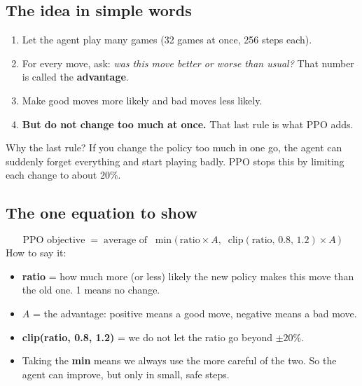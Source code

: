 \documentclass[11pt,a4paper]{article}
\begin{document}
\subsection*{The idea in simple words}
\begin{enumerate}
  \item Let the agent play many games (32 games at once, 256 steps each).
  \item For every move, ask: \emph{was this move better or worse than usual?} That number is
        called the \textbf{advantage}.
  \item Make good moves more likely and bad moves less likely.
  \item \textbf{But do not change too much at once.} That last rule is what PPO adds.
\end{enumerate}

Why the last rule? If you change the policy too much in one go, the agent can suddenly forget
everything and start playing badly. PPO stops this by limiting each change to about 20\%.

\subsection*{The one equation to show}
\[
\text{PPO objective} \;=\; \text{average of}\;\; \min\Big(\,\text{ratio}\times A,\;\;
\text{clip}(\text{ratio},\,0.8,\,1.2)\times A\,\Big)
\]
How to say it:
\begin{itemize}
  \item \textbf{ratio} = how much more (or less) likely the new policy makes this move than the old
        one. 1 means no change.
  \item $A$ = the advantage: positive means a good move, negative means a bad move.
  \item \textbf{clip(ratio, 0.8, 1.2)} = we do not let the ratio go beyond $\pm20\%$.
  \item Taking the \textbf{min} means we always use the more careful of the two. So the agent can
        improve, but only in small, safe steps.
\end{itemize}
\end{document}
